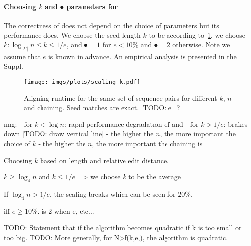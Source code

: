\paragraph{Choosing $k$ and $\spot$ parameters for \astarpa}
The correctness of \astarpa does not depend on the choice of parameters but
its performance does. We choose the seed length $k$ to be according
to~\cref{GLOBALfig:scaling_k}, we choose $k: \log_{\lvert \Sigma \rvert} n \le k \le
1/e$, and $\spot = 1$ for $e < 10\%$ and $\spot=2$ otherwise. Note we assume that $e$ is
known in advance. An empirical analysis is presented in the Suppl.

\begin{figure}[H]
    \centering
    \texttt{[image: imgs/plots/scaling\_k.pdf]}\label{GLOBALfig:scaling-k}
    \caption{Aligning runtime for the same set of sequence pairs for different $k$, $n$ and chaining. Seed matches are exact.  [TODO: e=?]}
    \label{GLOBALfig:scaling_k}
\end{figure}

img:
- for $k < \log n$: rapid performance degradation of \sh and 
- for $k > 1/e$: brakes down [TODO: draw vertical line]
- the higher the $n$, the more important the choice of $k$
- the higher the $n$, the more important the chaining is

Choosing $k$ based on length and relative edit
distance.

$k \ge \log_4 n$ and $k \le 1/e$ => we choose $k$ to be the average

If $\log_4 n > 1/e$, the scaling breaks which can be seen for $20\%$.

 iff $e \ge 10\%$.
\spot is 2 when e, etc...

TODO: Statement that if the algorithm
becomes quadratic if k is too small or too big.
TODO: More generally, for N>f(k,e,\spot), the algorithm is quadratic.
